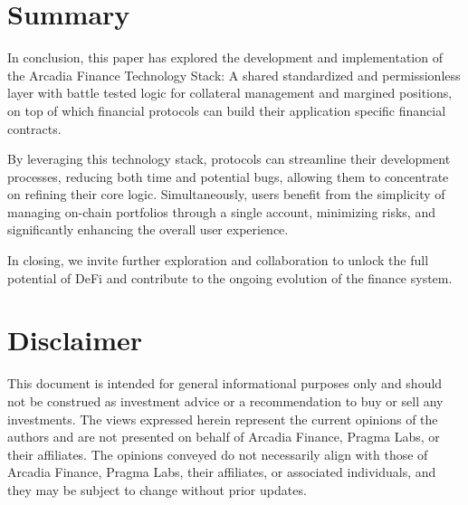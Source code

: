 \documentclass[sigconf,nonacm]{acmart}
\begin{document}
\section{Summary}
\label{sec:summary}
In conclusion, this paper has explored the development and implementation of the Arcadia Finance Technology Stack:
A shared standardized and permissionless layer with battle tested logic for collateral management and margined positions,
on top of which financial protocols can build their application specific financial contracts.

By leveraging this technology stack, protocols can streamline their development processes, reducing both time and potential bugs,
allowing them to concentrate on refining their core logic. 
Simultaneously, users benefit from the simplicity of managing on-chain portfolios through a single account, minimizing risks, and significantly enhancing the overall user experience.

In closing, we invite further exploration and collaboration to unlock the full potential of DeFi and contribute to the ongoing evolution of the finance system.




\section*{Disclaimer}
This document is intended for general informational purposes only and should not be construed as investment advice or
a recommendation to buy or sell any investments.
The views expressed herein represent the current opinions of the authors and are not presented on behalf of Arcadia Finance, Pragma Labs, or their affiliates.
The opinions conveyed do not necessarily align with those of Arcadia Finance, Pragma Labs, their affiliates, or associated individuals,
and they may be subject to change without prior updates.
\end{document}
